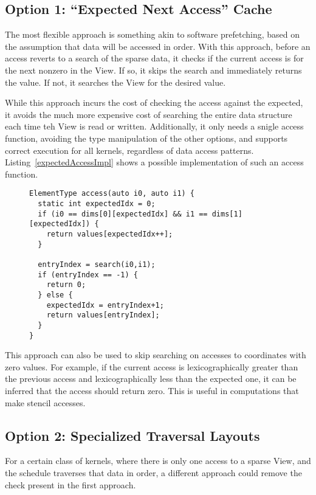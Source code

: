 \subsection{Option 1: ``Expected Next Access'' Cache}

The most flexible approach is something akin to software prefetching, based on the assumption that data will be accessed in order. 
With this approach, before an access reverts to a search of the sparse data, it checks if the current access is for the next nonzero in the View.
If so, it skips the search and immediately returns the value.
If not, it searches the View for the desired value.

While this approach incurs the cost of checking the access against the expected, it avoids the much more expensive cost of searching the entire data structure each time teh View is read or written.
Additionally, it only needs a snigle access function, avoiding the type manipulation of the other options, and supports correct execution for all kernels, regardless of data access patterns.
Listing~\ref{expectedAccessImpl} shows a possible implementation of such an access function.
\begin{figure}
\begin{lstlisting}[caption={Possible implementation fo the Expected Next Access approach to efficient data traversal.},label=expectedAccessImpl]
ElementType access(auto i0, auto i1) {
  static int expectedIdx = 0;
  if (i0 == dims[0][expectedIdx] && i1 == dims[1][expectedIdx]) {
    return values[expectedIdx++];
  }
  
  entryIndex = search(i0,i1);
  if (entryIndex == -1) {
    return 0;
  } else {
    expectedIdx = entryIndex+1;
    return values[entryIndex];
  }
}
\end{lstlisting}
\end{figure}

This approach can also be used to skip searching on accesses to coordinates with zero values.
For example, if the current access is lexicographically greater than the previous access and lexicographically less than the expected one, it can be inferred that the access should return zero. This is useful in computations that make stencil accesses.

\subsection{Option 2: Specialized Traversal Layouts}
For a certain class of kernels, where there is only one access to a sparse View, and the schedule traverses that data in order, a different approach could remove the check present in the first approach.

